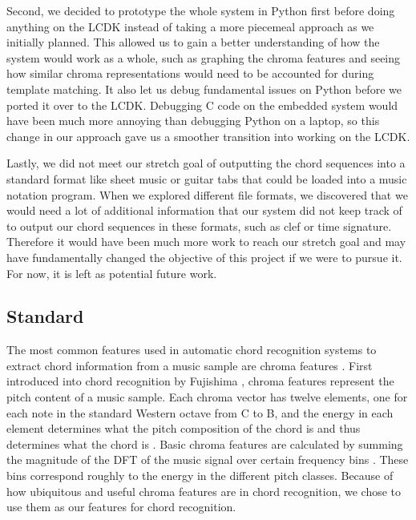 \documentclass[journal]{IEEEtran}
\begin{document}
Second, we decided to prototype the whole system in Python first before doing anything on the LCDK instead of taking a more piecemeal approach as we initially planned.
This allowed us to gain a better understanding of how the system would work as a whole, such as graphing the chroma features and seeing how similar chroma representations would need to be accounted for during template matching.
It also let us debug fundamental issues on Python before we ported it over to the LCDK.
Debugging C code on the embedded system would have been much more annoying than debugging Python on a laptop, so this change in our approach gave us a smoother transition into working on the LCDK.

Lastly, we did not meet our stretch goal of outputting the chord sequences into a standard format like sheet music or guitar tabs that could be loaded into a music notation program.
When we explored different file formats, we discovered that we would need a lot of additional information that our system did not keep track of to output our chord sequences in these formats, such as clef or time signature.
Therefore it would have been much more work to reach our stretch goal and may have fundamentally changed the objective of this project if we were to pursue it.
For now, it is left as potential future work.


\subsection{Standard}
The most common features used in automatic chord recognition systems to extract chord information from a music sample are chroma features \cite{cho_chroma}.
First introduced into chord recognition by Fujishima \cite{fujishima}, chroma features represent the pitch content of a music sample.
Each chroma vector has twelve elements, one for each note in the standard Western octave from C to B, and the energy in each element determines what the pitch composition of the chord is and thus determines what the chord is \cite{jiang}.
Basic chroma features are calculated by summing the magnitude of the DFT of the music signal over certain frequency bins \cite{fujishima}.
These bins correspond roughly to the energy in the different pitch classes.
Because of how ubiquitous and useful chroma features are in chord recognition, we chose to use them as our features for chord recognition.
\end{document}
